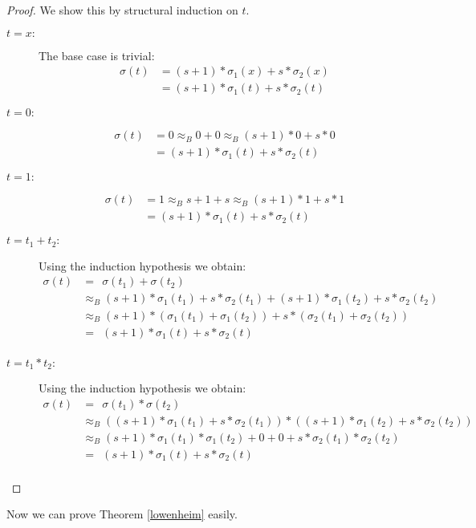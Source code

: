 		\begin{proof}
		We show this by structural induction on $t$.
		\begin{description}
		\item[$t=x:$]The base case is trivial:
				\begin{align*}
				\sigma(t)&=(s+1)*\sigma_1(x)+s*\sigma_2(x)\\
				&=(s+1)*\sigma_1(t)+s*\sigma_2(t)
				\end{align*}
		\item[$t=0:$]
				\begin{align*}
				\sigma(t)&=0
				\approx_B0+0
				\approx_B(s+1)*0+s*0\\
				&=(s+1)*\sigma_1(t)+s*\sigma_2(t)
				\end{align*}
		\item[$t=1:$]
				\begin{align*}
				\sigma(t)&=1
				\approx_Bs+1+s
				\approx_B(s+1)*1+s*1\\
				&=(s+1)*\sigma_1(t)+s*\sigma_2(t)
				\end{align*}
		\item[$t=t_1+t_2:$]Using the induction hypothesis we obtain:
				\begin{align*}
				\sigma(t)&=\ \ \sigma(t_1)+\sigma(t_2)\\
				&\approx_B(s+1)*\sigma_1(t_1)+s*\sigma_2(t_1)+(s+1)*\sigma_1(t_2)+s*\sigma_2(t_2)\\
				&\approx_B(s+1)*(\sigma_1(t_1)+\sigma_1(t_2))+s*(\sigma_2(t_1)+\sigma_2(t_2))\\
				&=\ \ (s+1)*\sigma_1(t)+s*\sigma_2(t)\\
				\end{align*}
		\item[$t=t_1*t_2:$]Using the induction hypothesis we obtain:
				\begin{align*}
				\sigma(t)&=\ \ \sigma(t_1)*\sigma(t_2)\\
				&\approx_B((s+1)*\sigma_1(t_1)+s*\sigma_2(t_1))*((s+1)*\sigma_1(t_2)+s*\sigma_2(t_2))\\
				&\approx_B(s+1)*\sigma_1(t_1)*\sigma_1(t_2)+0+0+s*\sigma_2(t_1)*\sigma_2(t_2)\\
				&=\ \ (s+1)*\sigma_1(t)+s*\sigma_2(t)\\
				\end{align*}
		\end{description}
		\end{proof}
		Now we can prove Theorem \ref{lowenheim} easily.
